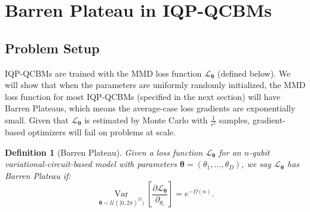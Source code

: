 \documentclass[a4paper,onecolumn,notitlepage,nofootinbib,longbibliography,superscriptaddress, floatfix, pra, aps, 10pt]{revtex4-2}
\newcommand{\vttheta}{{\bm{\theta}}}
\newtheorem{definition}{Definition}
\begin{document}
\section{Barren Plateau in IQP-QCBMs}
\subsection{Problem Setup}
IQP-QCBMs are trained with the MMD loss function $\mathcal{L}_\vttheta$ (defined below). We will show that when the parameters are uniformly randomly initialized, the MMD loss function for most IQP-QCBMs (specified in the next section) will have Barren Plateaus, which means the average-case loss gradients are exponentially small. Given that $\mathcal{L}_\vttheta$ is estimated by Monte Carlo with $\frac{1}{\epsilon^2}$ samples, gradient-based optimizers will fail on problems at scale.
\begin{definition}[Barren Plateau]
Given a loss function $\mathcal{L}_\vttheta$ for an $n$-qubit variational-circuit-based model with parameters $\vttheta = (\theta_1, \dots, \theta_D)$, we say $\mathcal{L}_\vttheta$ has Barren Plateau if:
\begin{equation}
\operatorname*{Var}_{\vttheta \sim \mathcal{U}([0,2\pi)^D)} [\frac{ \partial \mathcal{L}_\vttheta}{\partial_{\theta_i}}] = e^{-\Omega(n)}.
\end{equation}
\end{definition}

\end{document}
